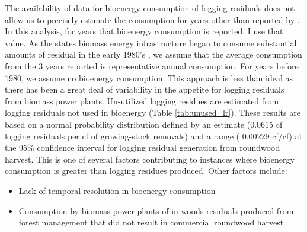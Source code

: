 \documentclass[a4paper]{article}
\begin{document}
The availability of data for bioenergy consumption of logging residuals does not allow us to precisely estimate the consumption for years other than reported by \cite{Mciver2012}. In this analysis, for years that bioenergy consumption is reported, I use that value. As the states biomass energy infrastructure began to consume substantial amounts of residual in the early 1980's \citep{Morris2000}, we assume that the average consumption from the 3 years reported is representative annual consumption. For years before 1980, we assume no bioenergy consumption.  This approach is less than ideal as there has been a great deal of variability in the appetite for logging residuals from biomass power plants. Un-utilized logging residues are estimated from logging residuals not used in bioenergy (Table \ref{tab:unused_lr}). These results are based on a normal probability distribution defined by an estimate (0.0615 cf logging residuals per cf of growing-stock removals) and a range (\textpm{} 0.00229 cf/cf) at the 95\% confidence interval for logging residual generation from roundwood harvest. This is one of several factors contributing to instances where bioenergy consumption is greater than logging residues  produced. Other factors include:

\begin{itemize}
\item Lack of temporal resolution in bioenergy consumption
\item Consumption by biomass power plants of in-woods residuals produced from forest management that did not result in commercial roundwood harvest
\end{itemize}
\end{document}
